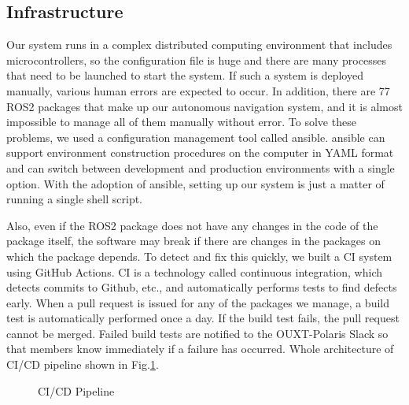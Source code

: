 \documentclass[lettersize,journal]{IEEEtran}
\begin{document}
\subsection{Infrastructure}
Our system runs in a complex distributed computing environment that includes microcontrollers,
so the configuration file is huge and there are many processes that need to be launched to start the system.
If such a system is deployed manually, various human errors are expected to occur.
In addition, there are 77 ROS2 packages that make up our autonomous navigation system,
and it is almost impossible to manage all of them manually without error.
To solve these problems, we used a configuration management tool called ansible.
ansible can support environment construction procedures on the computer in YAML format and
can switch between development and production environments with a single option.
With the adoption of ansible, setting up our system is just a matter of running a single shell script.

Also, even if the ROS2 package does not have any changes in the code of the package itself,
the software may break if there are changes in the packages on which the package depends.
To detect and fix this quickly, we built a CI system using GitHub Actions.
CI is a technology called continuous integration, which detects commits to Github, etc.,
and automatically performs tests to find defects early.
When a pull request is issued for any of the packages we manage, a build test is automatically performed once a day.
If the build test fails, the pull request cannot be merged.
Failed build tests are notified to the OUXT-Polaris Slack so that members know immediately if a failure has occurred.
Whole architecture of CI/CD pipeline shown in Fig.\ref{fig:ci_cd_pipeline}.

\begin{figure}[t]
    \begin{center}
  \end{center}
  \caption{CI/CD Pipeline}
  \label{fig:ci_cd_pipeline}
\end{figure}
\end{document}
